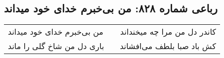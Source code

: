 \begin{center}
\section*{رباعی شماره ۸۲۸: من بی‌خبرم خدای خود میداند}
\label{sec:0828}
\begin{longtable}{l p{0.5cm} r}
من بی‌خبرم خدای خود میداند
&&
کاندر دل من مرا چه میخنداند
\\
باری دل من شاخ گلی را ماند
&&
کش باد صبا بلطف می‌افشاند
\\
\end{longtable}
\end{center}
